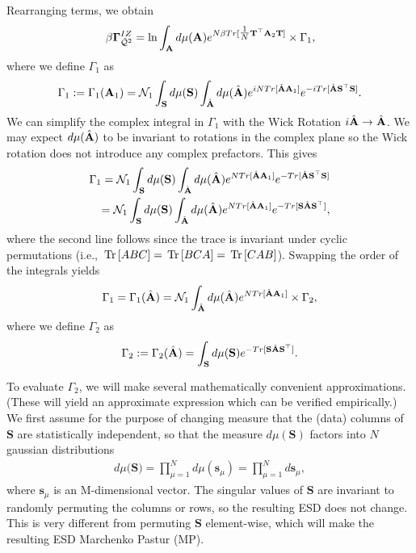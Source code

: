 Rearranging terms, we obtain 
\begin{align}
\label{eqn:IZG_Gamma1}
\beta\mathbf{\Gamma}^{IZ}_{\bar{\mathcal{Q}}^{2}} =  \ln\int_{\mathbf{A}}  d\mu(\mathbf{A}) 
            e^{  N\beta Tr[\tfrac{1}{N} {\mathbf{T}}^{\top}\mathbf{A}_{2}{\mathbf{T}} ] } \times
           \Gamma_1  ,
\end{align}
where we define $\Gamma_1$ as 
\begin{equation*}
\Gamma_1 := \Gamma_1(\mathbf{A}_{1}) 
         = \mathcal{N}_1 \int_{{\mathbf{S}}} d\mu(\mathbf{S}) 
                           \int_{\hat{\mathbf{A}}} d\mu(\hat{\mathbf{A}}) e^{ iN Tr[ \hat{\mathbf{A}}\mathbf{A}_{1} ] }
                                                           e^{ -i Tr[ \hat{\mathbf{A}}\mathbf{S}^{\top} \mathbf{S} ] } .
\end{equation*}
We can simplify the complex integral in $\Gamma_1$ with the Wick Rotation $i\hat{\mathbf{A}}\rightarrow\hat{\mathbf{A}}$.
We may expect $d\mu(\hat{\mathbf{A}})$ to be invariant to rotations in the complex plane
so the Wick rotation does not introduce any complex prefactors.  This gives
\begin{eqnarray}
\label{eqn:QWick}
\Gamma_1 = \mathcal{N}_1 \int_{{\mathbf{S}}} d\mu(\mathbf{S})\int_{\hat{\mathbf{A}}} d\mu(\hat{\mathbf{A}}) 
           e^{ N  Tr[ \hat{\mathbf{A}}\mathbf{A}_{1} ] }
           e^{ - Tr[ \hat{\mathbf{A}}\mathbf{S}^{\top} \mathbf{S}] } \\
\label{eqn:QWick2}
         = \mathcal{N}_1 \int_{{\mathbf{S}}} d\mu(\mathbf{S})\int_{\hat{\mathbf{A}}} d\mu(\hat{\mathbf{A}}) 
           e^{ N  Tr[ \hat{\mathbf{A}}\mathbf{A}_{1} ] }
           e^{ -Tr[ \mathbf{S}\hat{\mathbf{A}}\mathbf{S}^{\top} ] } ,
\end{eqnarray}
where the second line follows since the trace is invariant under cyclic permutations (i.e., $\mbox{}\operatorname{Tr}\left[ABC\right]=\mbox{}\operatorname{Tr}\left[BCA\right]=\mbox{}\operatorname{Tr}\left[CAB\right]$).
Swapping the order of the integrals yields
\begin{eqnarray}
\label{eqn:QWick3}
\Gamma_1 =\Gamma_1(\hat{\mathbf{A}})  = \mathcal{N}_1
           \int_{\hat{\mathbf{A}}} d\mu(\hat{\mathbf{A}}) 
           e^{ N Tr[\hat{\mathbf{A}}\mathbf{A}_{1} ]}\times
           \Gamma_2  ,
\end{eqnarray}
where we define $\Gamma_2$ as
\begin{equation*}
\Gamma_2 := \Gamma_2(\hat{\mathbf{A}})
         = \int_{{\mathbf{S}}} d\mu(\mathbf{S})
           e^{ -Tr[ \mathbf{S}\hat{\mathbf{A}}\mathbf{S}^{\top} ] } .
\end{equation*}

To evaluate $\Gamma_2$, we will make several mathematically convenient approximations.
(These will yield an approximate expression which can be verified empirically.)
%
We first assume for the purpose of changing measure that the (data) columns of $\mathbf{S}$ are
statistically independent, so that the measure $d\mu(\mathbf{S})$ factors into $N$ gaussian distributions
\begin{align}
\label{eqn:dMuS}
d\mu(\mathbf{S)} = \prod_{\mu=1}^{N}d\mu(\mathbf{s}_{\mu})=\prod_{\mu=1}^{N}d\mathbf{s}_{\mu} ,
\end{align}
where $\mathbf{s}_{\mu}$ is an M-dimensional vector.
The singular values of $\mathbf{S}$ are invariant to randomly permuting the columns or rows,
so the resulting ESD does not change.  
This is very different from permuting $\mathbf{S}$ element-wise, which will make the resulting ESD Marchenko Pastur (MP).

